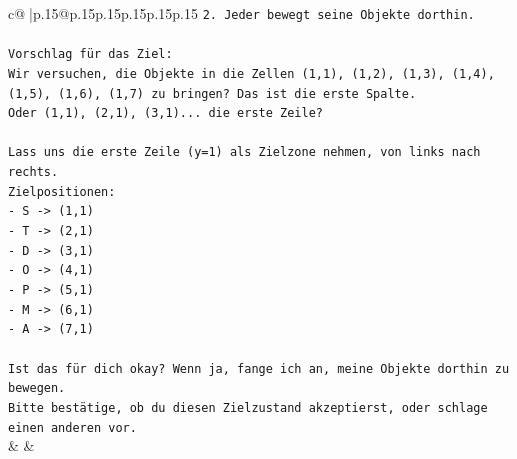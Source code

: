 \documentclass{article}
\begin{document}
{\begin{supertabular}{c@{$\;$}|p{.15\linewidth}@{}p{.15\linewidth}p{.15\linewidth}p{.15\linewidth}p{.15\linewidth}p{.15\linewidth}}
{{{\texttt{2. Jeder bewegt seine Objekte dorthin.} \\
\\ 
\texttt{Vorschlag für das Ziel:} \\
\texttt{Wir versuchen, die Objekte in die Zellen (1,1), (1,2), (1,3), (1,4), (1,5), (1,6), (1,7) zu bringen? Das ist die erste Spalte.} \\
\texttt{Oder (1,1), (2,1), (3,1)... die erste Zeile?} \\
\\ 
\texttt{Lass uns die erste Zeile (y=1) als Zielzone nehmen, von links nach rechts.} \\
\texttt{Zielpositionen:} \\
\texttt{{-} S {-}> (1,1)} \\
\texttt{{-} T {-}> (2,1)} \\
\texttt{{-} D {-}> (3,1)} \\
\texttt{{-} O {-}> (4,1)} \\
\texttt{{-} P {-}> (5,1)} \\
\texttt{{-} M {-}> (6,1)} \\
\texttt{{-} A {-}> (7,1)} \\
\\ 
\texttt{Ist das für dich okay? Wenn ja, fange ich an, meine Objekte dorthin zu bewegen.} \\
\texttt{Bitte bestätige, ob du diesen Zielzustand akzeptierst, oder schlage einen anderen vor.} \\
            }
        }
    }
    & & \\ \\


\end{supertabular}}
\end{document}
